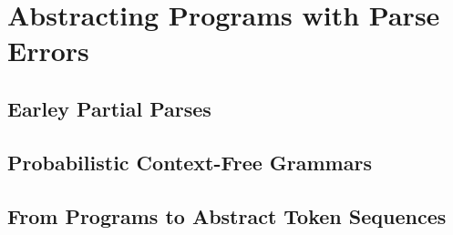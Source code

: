 \section{Abstracting Programs with Parse Errors}
\label{sec:prog-abstract}




\subsection{Earley Partial Parses} \label{sec:prog-abstract:partial}




\subsection{Probabilistic Context-Free Grammars}
\label{sec:prog-abstract:pcfg}




\subsection{From Programs to Abstract Token Sequences}





